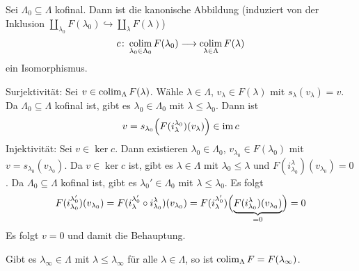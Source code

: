 \begin{lemma}[{name=[Isomorphismus zum Kolimes einer kofinalen Teilmenge]},label=lem:kofinal_gleicher_kolimes]
	Sei $\Lambda_0 \subseteq \Lambda$ kofinal. Dann ist die kanonische Abbildung (induziert von der Inklusion $\coprod_{\lambda_0} F(\lambda_0) \hookrightarrow \coprod_{\lambda} F(\lambda)$)
	\[
		c \colon \colim_{\lambda_0 \in \Lambda_0} F(\lambda_0) \longrightarrow \colim_{\lambda \in \Lambda} F(\lambda)
	\]
	ein Isomorphismus.
\end{lemma}
\begin{beweis}
	Surjektivität: Sei $v \in \colim_\Lambda F(\lambda)$. Wähle $\lambda \in \Lambda$, $v_\lambda \in F(\lambda)$ mit $s_\lambda(v_\lambda)=v$. 
	Da $\Lambda_0 \subseteq \Lambda$ kofinal ist, gibt es $\lambda_0 \in \Lambda_0$ mit $\lambda \le \lambda_0$. 
	Dann ist
	\[
		v = s_{\lambda_0} \enbrace*{F(i_\lambda^{\lambda_0})(v_\lambda)} \in \im c
	\]
	Injektivität: Sei $v \in \ker c$. Dann existieren $\lambda_0 \in \Lambda_0$, $v_{\lambda_0} \in F(\lambda_0)$ mit $v=s_{\lambda_0}(v_{\lambda_0})$. 
	Da $v \in \ker c$ ist, gibt es $\lambda \in \Lambda$ mit $\lambda_0 \le \lambda$ und $F(i_{\lambda_0}^{\lambda})(v_{\lambda_0}) =0$. 
	Da $\Lambda_0 \subseteq \Lambda$ kofinal ist, gibt es $\lambda_0' \in \Lambda_0$ mit $\lambda \le \lambda_0$. 
	Es folgt 
	\begin{align}
		F(i_{\lambda_0}^{\lambda_0'})(v_{\lambda_0}) = F (i_\lambda^{\lambda_0'} \circ i_{\lambda_0}^\lambda)(v_{\lambda_0}) = F(i_{\lambda}^{\lambda_0'}) \enbrace[\Big]{\Underbrace{F(i_{\lambda_0}^\lambda)(v_{\lambda_0})}{=0}} = 0
	\end{align}
	Es folgt $v=0$ und damit die Behauptung.
\end{beweis}

\begin{korollarB}[{name=[{einelementige kofinale Menge}]}]
	Gibt es $\lambda_\infty \in \Lambda$ mit $\lambda \le \lambda_\infty$ für alle $\lambda \in \Lambda$, so ist $\colim_\Lambda F = F(\lambda_\infty)$.
\end{korollarB}

